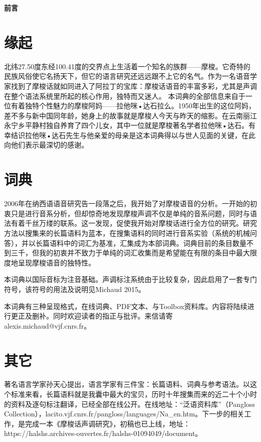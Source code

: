 	{\LARGE \textbf{前言}}
	\section{缘起} \label{sec:language}

北纬27.50度东经100.41度的交界点上生活着一个知名的族群——摩梭。它奇特的民族风俗使它名扬天下，但它的语言研究还远远跟不上它的名气。作为一名语音学家找到了摩梭话就如同进入了阿拉丁的宝库：摩梭话语音的丰富多彩，尤其是声调在整个语法系统里所起的核心作用，独特而又迷人。
本词典的全部信息来自于一位有着独特个性魅力的摩梭阿妈——拉他咪•达石拉么。1950年出生的这位阿妈，差不多与新中国同年龄，她身上的故事就是摩梭人今天与昨天的缩影。在云南丽江永宁乡平静村独自养育了四个儿女，其中一位就是摩梭著名学者拉他咪•达石。有幸结识拉他咪•达石先生与他亲爱的母亲是这本词典得以与世人见面的关键，在此向他们表示最深切的感谢。

	\section{词典} \label{sec:method}

2006年在纳西语语音研究告一段落之后，我开始了对摩梭语音的分析。一开始的初衷只是进行音系分析，但却惊奇地发现摩梭声调不仅是单纯的音系问题，同时与语法有着千丝万缕的联系。这一发现，促使我开始对摩梭话进行全方位的研究。研究方法以搜集来的长篇语料为蓝本，在搜集语料的同时进行音系实验（系统的机械问答），并以长篇语料中的词汇为基准，汇集成为本部词典。词典目前的条目数量不到三千，但我的初衷并不致力于单纯的词汇收集而是希望能在有限的条目中最大限度地呈现摩梭语音的独特性。

本词典以国际音标为注音基础。声调标注系统由于比较复杂，因此启用了一套专门符号，该符号的用法及说明见Michaud 2015。

本词典有三种呈现格式，在线词典、PDF文本、与Toolbox资料库。内容将陆续进行更正及删补。同时欢迎读者的指正与批评。来信请寄alexis.michaud@vjf.cnrs.fr。

\section{其它} \label{sec:other}

著名语言学家孙天心提出，语言学家有三件宝：长篇语料、词典与参考语法。以这个标准来看，长篇语料就是我囊中最大的宝贝，历时十年搜集而来的近二十个小时的资料及逐句标注翻译，已经全部在线公开。在线地址：“泛语资料库”（Pangloss Collection），lacito.vjf.cnrs.fr/pangloss/languages/Na\_en.htm。下一步的相关工作，是完成一本《摩梭话声调研究》，初稿也已上线，地址：https://halshs.archives-ouvertes.fr/halshs-01094049/document。

